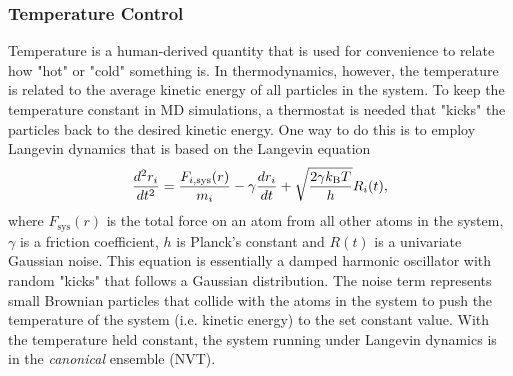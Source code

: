 \subsubsection{Temperature Control}
Temperature is a human-derived quantity that is used for convenience to relate how "hot" or "cold" 
something is. In thermodynamics, however, the temperature is related to the average kinetic energy of 
all particles in the system. To keep the temperature constant in MD simulations, a thermostat is 
needed that "kicks" the particles back to the desired kinetic energy. One way to do this is to 
employ Langevin dynamics that is based on the Langevin equation
\begin{equation}
\frac{d^2 r_{i}}{dt^2} = \frac{F_{i,\text{sys}}(r)}{m_{i}} - \gamma \frac{d r_{i}}{dt} + \sqrt{\frac{2\gamma k_{\text{B}}T}{h}}R_{i}(t) ,
\label{eq:nvt}
\end{equation}
where $F_{\text{sys}}(r)$ is the total force on an atom from all other atoms in the system, 
$\gamma$ is a friction coefficient, $h$ is Planck's constant and $R(t)$ is a univariate Gaussian 
noise. This equation is essentially a damped harmonic oscillator with random "kicks" that follows 
a Gaussian distribution. The noise term represents small Brownian particles that collide 
with the atoms in the system to push the temperature of the system (i.e. kinetic energy) to the 
set constant value. With the temperature held constant, the system running under Langevin dynamics 
is in the {\it canonical} ensemble (NVT).

